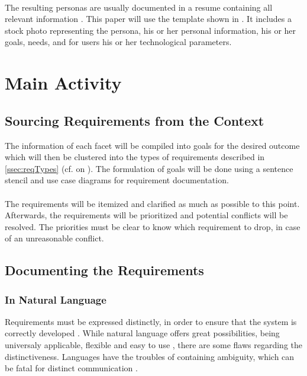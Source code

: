 \paragraph{} The resulting personas are usually documented in a resume containing all relevant information \parencites[cf.][40]{Robier.2016}[cf.][]{Platt.2016}. This paper will use the template shown in . It includes a stock photo representing the persona, his or her personal information, his or her goals, needs, and for users his or her technological parameters.


\section{Main Activity}

\subsection{Sourcing Requirements from the Context}

The information of each facet will be compiled into goals for the desired outcome which will then be clustered into the types of requirements described in \cref{ssec:reqTypes} (cf.  on ). The formulation of goals will be done using a sentence stencil and use case diagrams for requirement documentation. 

\paragraph{} The requirements will be itemized and clarified as much as possible to this point. Afterwards, the requirements will be prioritized and potential conflicts will be resolved. The priorities must be clear to know which requirement to drop, in case of an unreasonable conflict.


\subsection{Documenting the Requirements}

\subsubsection{In Natural Language}
Requirements must be expressed distinctly, in order to ensure that the system is correctly developed \parencites[107]{Ebert.2014}. While natural language offers great possibilities, being universaly applicable, flexible and easy to use \parencite[cf.][239]{Pohl.2007}, there are some flaws regarding the distinctiveness. Languages have the troubles of containing  ambiguity, which can be fatal for distinct communication \parencite[cf.][239-243]{Pohl.2007}.

